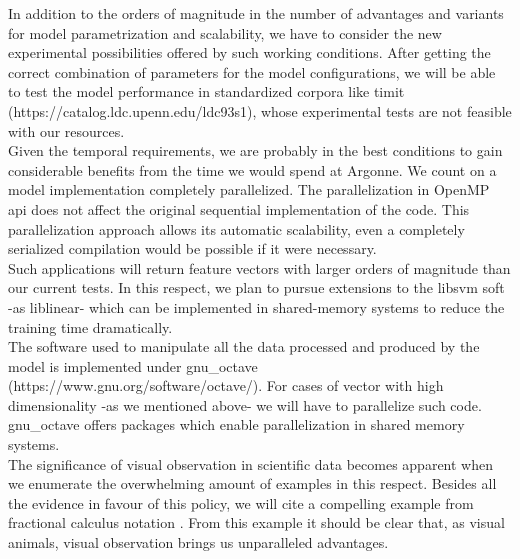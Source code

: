 \documentclass[11pt,a4paper]{article}
\begin{document}
In addition to the orders of magnitude in the number of advantages and variants for 
model parametrization and scalability, we have to consider the new experimental
possibilities offered by such working conditions.
After getting the correct combination of parameters for the model configurations,
we will be able to test the model performance in standardized corpora like
\gls{timit} (https://catalog.ldc.upenn.edu/ldc93s1), whose experimental tests
are not feasible with our resources. \\

Given the temporal requirements, we are probably in the best conditions to gain
considerable benefits from the time we would spend at Argonne.
We count on a model implementation completely parallelized.
The parallelization in OpenMP \gls{api} does not affect the original sequential implementation
of the code. This parallelization approach allows its automatic scalability, even a completely serialized
compilation would be possible if it were necessary. \\

Such applications will return feature vectors with larger orders of magnitude than our current tests.
In this respect, we plan to pursue extensions to the \gls{libsvm} soft -as \gls{liblinear}- which can be implemented in
shared-memory systems to reduce the training time dramatically. \\

The software used to manipulate all the data processed and produced by the model
is implemented under \gls{gnu_octave} (https://www.gnu.org/software/octave/).
For cases of vector with high dimensionality -as we mentioned above-
we will have to parallelize such code.
\gls{gnu_octave} offers packages which enable parallelization in shared memory systems. \\

The significance of visual observation in scientific data becomes apparent
when we enumerate the overwhelming amount of examples in this respect.
Besides all the evidence in favour of this policy, we will cite
a compelling example from fractional calculus notation \cite{Miller_1993}.
From this example it should be clear that, as visual animals,
visual observation brings us unparalleled advantages. \\

 \\
\end{document}
